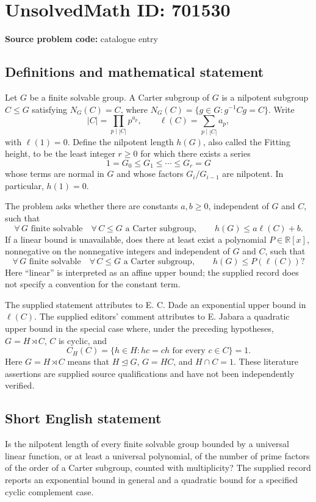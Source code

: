 \documentclass[11pt]{article}
\newcommand{\R}{\mathbb{R}}
\begin{document}
\section*{UnsolvedMath ID: 701530}
\textbf{Source problem code:} catalogue entry
\subsection{Definitions and mathematical statement}
Let \(G\) be a finite solvable group. A Carter subgroup of \(G\) is a nilpotent subgroup \(C\leq G\) satisfying \(N_G(C)=C\), where \(N_G(C)=\{g\in G:g^{-1}Cg=C\}\). Write
\[
|C|=\prod_{p\mid |C|}p^{a_p},\qquad \ell(C)=\sum_{p\mid |C|}a_p,
\]
with \(\ell(1)=0\). Define the nilpotent length \(h(G)\), also called the Fitting height, to be the least integer \(r\geq 0\) for which there exists a series
\[
1=G_0\leq G_1\leq\cdots\leq G_r=G
\]
whose terms are normal in \(G\) and whose factors \(G_i/G_{i-1}\) are nilpotent. In particular, \(h(1)=0\).

The problem asks whether there are constants \(a,b\geq 0\), independent of \(G\) and \(C\), such that
\[
\forall\,G\text{ finite solvable}\quad\forall\,C\leq G\text{ a Carter subgroup},\qquad h(G)\leq a\ell(C)+b.
\]
If a linear bound is unavailable, does there at least exist a polynomial \(P\in\R[x]\), nonnegative on the nonnegative integers and independent of \(G\) and \(C\), such that
\[
\forall\,G\text{ finite solvable}\quad\forall\,C\leq G\text{ a Carter subgroup},\qquad h(G)\leq P(\ell(C))?
\]
Here ``linear'' is interpreted as an affine upper bound; the supplied record does not specify a convention for the constant term.

The supplied statement attributes to E. C. Dade an exponential upper bound in \(\ell(C)\). The supplied editors' comment attributes to E. Jabara a quadratic upper bound in the special case where, under the preceding hypotheses, \(G=H\rtimes C\), \(C\) is cyclic, and
\[
C_H(C)=\{h\in H:hc=ch\text{ for every }c\in C\}=1.
\]
Here \(G=H\rtimes C\) means that \(H\trianglelefteq G\), \(G=HC\), and \(H\cap C=1\). These literature assertions are supplied source qualifications and have not been independently verified.
\subsection{Short English statement}
Is the nilpotent length of every finite solvable group bounded by a universal linear function, or at least a universal polynomial, of the number of prime factors of the order of a Carter subgroup, counted with multiplicity? The supplied record reports an exponential bound in general and a quadratic bound for a specified cyclic complement case.
\end{document}
